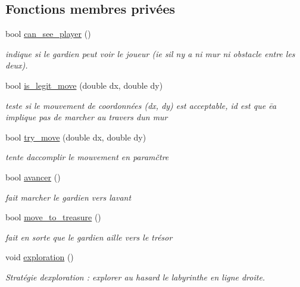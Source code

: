 \subsection*{Fonctions membres privées}
\begin{DoxyCompactItemize}
\item 
bool \hyperlink{classGardien_ab4cae0375789f78258d37ccb16004a4d}{can\+\_\+see\+\_\+player} ()
\begin{DoxyCompactList}\small\item\em indique si le gardien peut voir le joueur (ie s\textquotesingle{}il n\textquotesingle{}y a ni mur ni obstacle entre les deux). \end{DoxyCompactList}\item 
bool \hyperlink{classGardien_aab71ebf5fb9fc0053459bac6bdd0f466}{is\+\_\+legit\+\_\+move} (double dx, double dy)
\begin{DoxyCompactList}\small\item\em teste si le mouvement de coordonnées (dx, dy) est acceptable, id est que ēa implique pas de marcher au travers d\textquotesingle{}un mur \end{DoxyCompactList}\item 
bool \hyperlink{classGardien_a851adaf99e906da7469567829893b8f4}{try\+\_\+move} (double dx, double dy)
\begin{DoxyCompactList}\small\item\em tente d\textquotesingle{}accomplir le mouvement en paramčtre \end{DoxyCompactList}\item 
bool \hyperlink{classGardien_a1ba8ec13ead6e60ab60b9944a89212fc}{avancer} ()
\begin{DoxyCompactList}\small\item\em fait marcher le gardien vers l\textquotesingle{}avant \end{DoxyCompactList}\item 
bool \hyperlink{classGardien_a1661d21c1b1f3155fd626c1af22db4fc}{move\+\_\+to\+\_\+treasure} ()
\begin{DoxyCompactList}\small\item\em fait en sorte que le gardien aille vers le trésor \end{DoxyCompactList}\item 
void \hyperlink{classGardien_a8b3b6c0120adeaf40365c1b5f95b1a18}{exploration} ()
\begin{DoxyCompactList}\small\item\em Stratégie d\textquotesingle{}exploration \+: explorer au hasard le labyrinthe en ligne droite. \end{DoxyCompactList}\item 

\end{DoxyCompactItemize}

